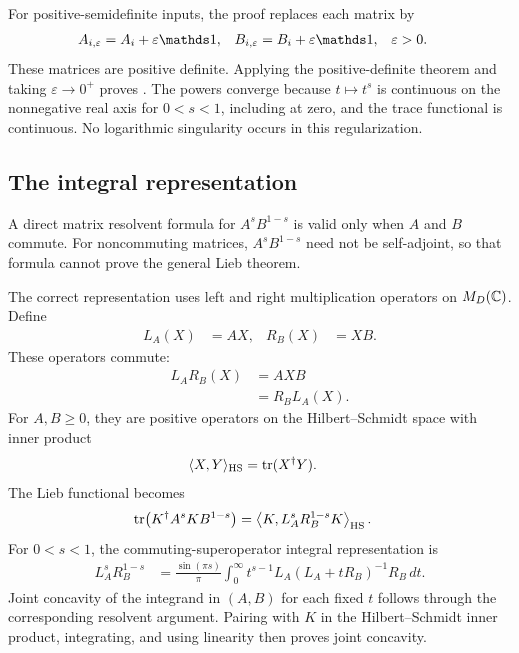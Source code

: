 \documentclass{article}
\begin{document}
For positive-semidefinite inputs, the proof replaces each matrix by
\begin{align}
    A_{i,\varepsilon}&=A_i+\varepsilon\Id,
    &
    B_{i,\varepsilon}&=B_i+\varepsilon\Id,
    &
    \varepsilon&>0.
    \label{eq:wolf_ch5_operator_jensen_lieb_regularized_inputs}
\end{align}
These matrices are positive definite. Applying the positive-definite theorem
and taking $\varepsilon\to 0^+$ proves . The powers
converge because $t\mapsto t^s$ is continuous on the nonnegative real axis for
$0<s<1$, including at zero, and the trace functional is continuous. No
logarithmic singularity occurs in this regularization.

\subsection{The integral representation}
\label{ssec:wolf_ch5_operator_jensen_lieb_integral_route}

A direct matrix resolvent formula for $A^sB^{1-s}$ is valid only when $A$ and
$B$ commute. For noncommuting matrices, $A^sB^{1-s}$ need not be
self-adjoint, so that formula cannot prove the general Lieb theorem.

The correct representation uses left and right multiplication operators on
$M_D(\mathbb{C})$. Define
\begin{align}
    L_A(X)&=AX,
    &
    R_B(X)&=XB.
    \label{eq:wolf_ch5_operator_jensen_lieb_left_right_multiplication}
\end{align}
These operators commute:
\begin{align}
    L_AR_B(X)
        &=AXB
    \label{eq:wolf_ch5_operator_jensen_lieb_superoperator_commutation_first}\\
        &=R_BL_A(X).
    \label{eq:wolf_ch5_operator_jensen_lieb_superoperator_commutation_second}
\end{align}
For $A,B\geq 0$, they are positive operators on the Hilbert--Schmidt space
with inner product
\begin{align}
    \langle X,Y\rangle_{\mathrm{HS}}
        &=\operatorname{tr}(X^\dagger Y).
    \label{eq:wolf_ch5_operator_jensen_lieb_hilbert_schmidt_inner_product}
\end{align}
The Lieb functional becomes
\begin{align}
    \operatorname{tr}\!\left(K^\dagger A^sKB^{1-s}\right)
        &=
        \left\langle
            K,L_A^sR_B^{1-s}K
        \right\rangle_{\mathrm{HS}}.
    \label{eq:wolf_ch5_operator_jensen_lieb_superoperator_pairing}
\end{align}
For $0<s<1$, the commuting-superoperator integral representation is
\begin{align}
    L_A^sR_B^{1-s}
        &=
        \frac{\sin(\pi s)}{\pi}
        \int_0^\infty
            t^{s-1}
            L_A(L_A+tR_B)^{-1}R_B
        \,dt.
    \label{eq:wolf_ch5_operator_jensen_lieb_superoperator_integral}
\end{align}
Joint concavity of the integrand in $(A,B)$ for each fixed $t$ follows through
the corresponding resolvent argument. Pairing with $K$ in the
Hilbert--Schmidt inner product, integrating, and using linearity then proves
joint concavity.
\end{document}
